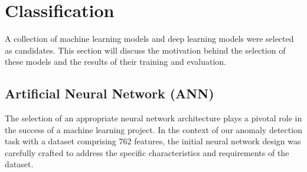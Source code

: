 \documentclass[conference]{IEEEtran}
\begin{document}
\section{Classification}
A collection of machine learning models and deep learning models were selected as candidates. This section will discuss the motivation behind the selection of these models and the results of their training and evaluation.
\subsection{Artificial Neural Network (ANN)}
The selection of an appropriate neural network architecture plays a pivotal role in the success of a machine learning project. In the context of our anomaly detection task with a dataset comprising 762 features, the initial neural network design was carefully crafted to address the specific characteristics and requirements of the dataset.
\end{document}
